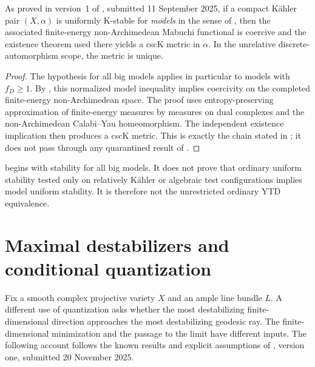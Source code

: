 \begin{theorem}\label{thm:ytd-mpwn-implication}
As proved in version~1 of \cite{MPWN25}, submitted
11 September 2025, if a compact K\"ahler pair $(X,\alpha)$ is
uniformly K-stable for \emph{models} in the sense of
, then the associated
finite-energy non-Archimedean Mabuchi functional is coercive and the
existence theorem used there yields a cscK metric in $\alpha$.
In the unrelative discrete-automorphism scope, the metric is unique.
\end{theorem}

\begin{proof}
The hypothesis for all big models applies in particular to models
with $f_D\geq1$.  By , this normalized
model inequality implies coercivity on the completed finite-energy
non-Archimedean space.  The proof uses entropy-preserving approximation
of finite-energy measures by measures on dual complexes and the
non-Archimedean Calabi--Yau homeomorphism. The independent existence
implication \cite[Theorem~A]{MP24} then produces a cscK metric.
This is exactly the chain stated in
\cite[Corollary~9.2.2]{MPWN25}; it does not pass through any
quarantined result of \cite{BHJ19}.
\end{proof}

\begin{remark}
\label{rem:ytd-mpwn-scope}
 begins with stability for all
big models. It does not prove that ordinary uniform stability tested
only on relatively K\"ahler or algebraic test configurations implies
model uniform stability. It is therefore not the unrestricted ordinary
YTD equivalence.
\end{remark}

\section{Maximal destabilizers and conditional quantization}
\label{sec:ytd-maximal-destabilizers}

Fix a smooth complex projective variety $X$ and an ample line bundle
$L$. A different use of quantization asks whether the most destabilizing
finite-dimensional direction approaches the most destabilizing geodesic
ray. The finite-dimensional minimization and the passage to the limit
have different inputs. The following account follows the known results
and explicit assumptions of \cite{Yao25MaximalDestabilizers}, version one,
submitted 20 November 2025.

